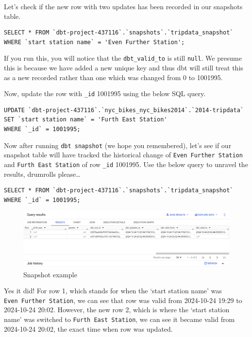 \documentclass[
]{book}
\begin{document}
Let's check if the new row with two updates has been recorded in our snapshots table.

\begin{verbatim}
SELECT * FROM `dbt-project-437116`.`snapshots`.`tripdata_snapshot`
WHERE `start station name` = 'Even Further Station';
\end{verbatim}

If you run this, you will notice that the \texttt{dbt\_valid\_to} is still \texttt{null}. We presume this is because we have added a new unique key and thus dbt will still treat this as a new recorded rather than one which was changed from 0 to 1001995.

Now, update the row with \texttt{\_id} 1001995 using the below SQL query.

\begin{verbatim}
UPDATE `dbt-project-437116`.`nyc_bikes_nyc_bikes2014`.`2014-tripdata`
SET `start station name` = 'Furth East Station'
WHERE `_id` = 1001995;
\end{verbatim}

Now after running \texttt{dbt\ snapshot} (we hope you remembered), let's see if our snapshot table will have tracked the historical change of \texttt{Even\ Further\ Station} and \texttt{Furth\ East\ Station} of row \texttt{\_id} 1001995. Use the below query to unravel the results, drumrolls please\ldots{}

\begin{verbatim}
SELECT * FROM `dbt-project-437116`.`snapshots`.`tripdata_snapshot`
WHERE `_id` = 1001995;
\end{verbatim}

\begin{figure}
\centering
\includegraphics{./images/snapshot_example.png}
\caption{Snapshot example}
\end{figure}

Yes it did! For row 1, which stands for when the `start station name' was \texttt{Even\ Further\ Station}, we can see that row was valid from 2024-10-24 19:29 to 2024-10-24 20:02. However, the new row 2, which is where the `start station name' was switched to \texttt{Furth\ East\ Station}, we can see it became valid from 2024-10-24 20:02, the exact time when row was updated.
\end{document}
